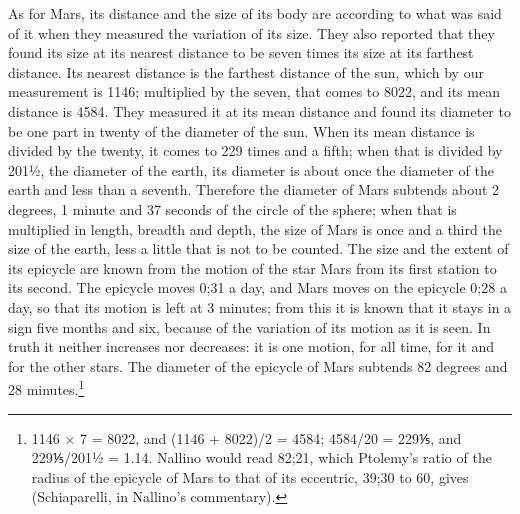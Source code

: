 \documentclass[11pt]{article}
\newcommand{\ArPage}[1]{\marginpar{\footnotesize\color{gray}Ar.\,p.\,#1}}
\begin{document}
\par \ArPage{184}As for Mars, its distance and the size of its body are according to what was said of it when they measured the variation of its size. They also reported that they found its size at its nearest distance to be seven times its size at its farthest distance. Its nearest distance is the farthest distance of the sun, which by our measurement is 1146; multiplied by the seven, that comes to 8022, and its mean distance is 4584. They measured it at its mean distance and found its diameter to be one part in twenty of the diameter of the sun. When its mean distance is divided by the twenty, it comes to 229 times and a fifth; when that is divided by 201½, the diameter of the earth, its diameter is about once the diameter of the earth and less than a seventh. Therefore the diameter of Mars subtends about 2 degrees, 1 minute and 37 seconds of the circle of the sphere; when that is multiplied in length, breadth and depth, the size of Mars is once and a third the size of the earth, less a little that is not to be counted. The size and the extent of its epicycle are known from the motion of the star Mars from its first station to its second. The epicycle moves 0;31 a day, and Mars moves on the epicycle 0;28 a day, so that its motion is left at 3 minutes; from this it is known that it stays in a sign five months and six, because of the variation of its motion as it is seen. In truth it neither increases nor decreases: it is one motion, for all time, for it and for the other stars. The diameter of the epicycle of Mars subtends 82 degrees and 28 minutes.\footnote{1146 × 7 = 8022, and (1146 + 8022)/2 = 4584; 4584/20 = 229⅕, and 229⅕/201½ = 1.14. Nallino would read 82;21, which Ptolemy's ratio of the radius of the epicycle of Mars to that of its eccentric, 39;30 to 60, gives (Schiaparelli, in Nallino's commentary).}\par
\end{document}
